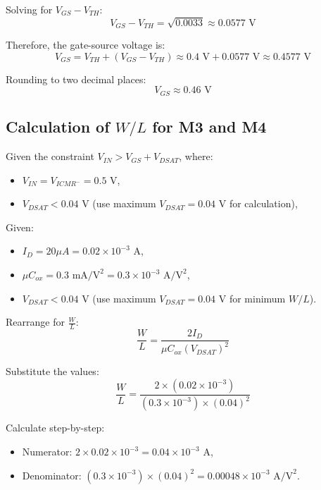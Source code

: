 Solving for $V_{GS} - V_{TH}$:
\begin{equation}
    V_{GS} - V_{TH} = \sqrt{0.0033} \approx 0.0577 \text{ V}
\end{equation}

Therefore, the gate-source voltage is:
\begin{equation}
    V_{GS} = V_{TH} + (V_{GS} - V_{TH}) \approx 0.4 \text{ V} + 0.0577 \text{ V} \approx 0.4577 \text{ V}
\end{equation}

Rounding to two decimal places:
\begin{equation}
    V_{GS} \approx 0.46 \text{ V}
\end{equation}

\subsection{Calculation of $W/L$ for M3 and M4}

Given the constraint $V_{IN} > V_{GS} + V_{DSAT}$, where:
\begin{itemize}
    \item $V_{IN} = V_{ICMR^-} = 0.5 \text{ V}$,
    \item $V_{DSAT} < 0.04 \text{ V}$ (use maximum $V_{DSAT} = 0.04 \text{ V}$ for calculation),
\end{itemize}

Given:
\begin{itemize}
    \item $I_D = 20 \mu A = 0.02 \times 10^{-3} \text{ A}$,
    \item $\mu C_{ox} = 0.3 \text{ mA/V}^2 = 0.3 \times 10^{-3} \text{ A/V}^2$,
    \item $V_{DSAT} < 0.04 \text{ V}$ (use maximum $V_{DSAT} = 0.04 \text{ V}$ for minimum $W/L$).
\end{itemize}

Rearrange for $\frac{W}{L}$:
\begin{equation}
    \frac{W}{L} = \frac{2I_D}{\mu C_{ox} (V_{DSAT})^2}
\end{equation}

Substitute the values:
\begin{equation}
    \frac{W}{L} = \frac{2 \times (0.02 \times 10^{-3})}{(0.3 \times 10^{-3}) \times (0.04)^2}
\end{equation}

Calculate step-by-step:
\begin{itemize}
    \item Numerator: $2 \times 0.02 \times 10^{-3} = 0.04 \times 10^{-3} \text{ A}$,
    \item Denominator: $(0.3 \times 10^{-3}) \times (0.04)^2 = 0.00048 \times 10^{-3} \text{ A/V}^2$.
\end{itemize}

